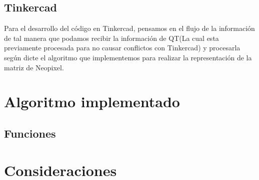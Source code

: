 \documentclass{article}
\begin{document}
    
    \subsection{Tinkercad}
    \begin{flushleft}
        Para el desarrollo del código en Tinkercad, pensamos en el flujo de la información de tal manera que podamos recibir la información de QT(La cual esta previamente procesada para no causar conflictos con Tinkercad) y procesarla según dicte el algoritmo que implementemos para realizar la representación de la matriz de Neopixel. 
    \end{flushleft}
        
    
\section{Algoritmo implementado}
\label{implementado}
    \begin{flushleft}
    
    \subsection{Funciones}
    \begin{flushleft}
    
    \vspace*{0.3cm}
        
    \end{flushleft}
    \end{flushleft}
    
    \vspace*{0.1cm}
    
\section{Consideraciones}
\label{consideraciones}
    \begin{flushleft}
        
    \end{flushleft}
    \vspace*{2cm}
\newpage    
    

\vfill
\vspace*{0.5cm}

\end{document}
